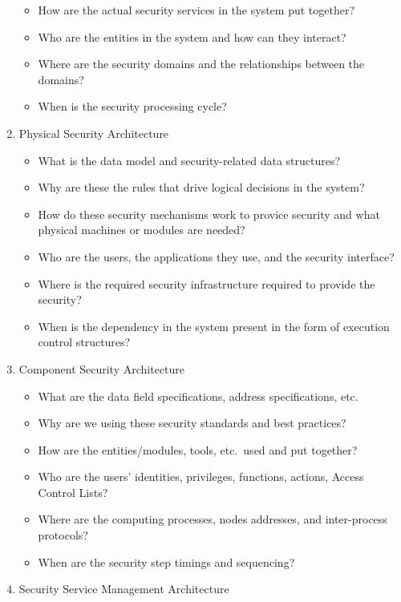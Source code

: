 \begin{questions}
\begin{parts}
\begin{solution}
\begin{enumerate}[noitemsep]
\begin{itemize}[noitemsep]
        \item How are the actual security services in the system put together?
        \item Who are the entities in the system and how can they interact?
        \item Where are the security domains and the relationships between the domains?
        \item When is the security processing cycle?
        \end{itemize}
      \item Physical Security Architecture
        \begin{itemize}[noitemsep]
        \item What is the data model and security-related data structures?
        \item Why are these the rules that drive logical decisions in the system?
        \item How do these security mechanisms work to provice security and what physical machines or modules are needed?
        \item Who are the users, the applications they use, and the security interface?
        \item Where is the required security infrastructure required to provide the security?
        \item When is the dependency in the system present in the form of execution control structures?
        \end{itemize}
      \item Component Security Architecture
        \begin{itemize}[noitemsep]
        \item What are the data field specifications, address specifications, etc.
        \item Why are we using these security standards and best practices?
        \item How are the entities/modules, tools, etc.\ used and put together?
        \item Who are the users' identities, privileges, functions, actions, Access Control Lists?
        \item Where are the computing processes, nodes addresses, and inter-process protocols?
        \item When are the security step timings and sequencing?
        \end{itemize}
      \item Security Service Management Architecture
        \begin{itemize}[noitemsep]

\end{itemize}
\end{enumerate}
\end{solution}
\end{parts}
\end{questions}
